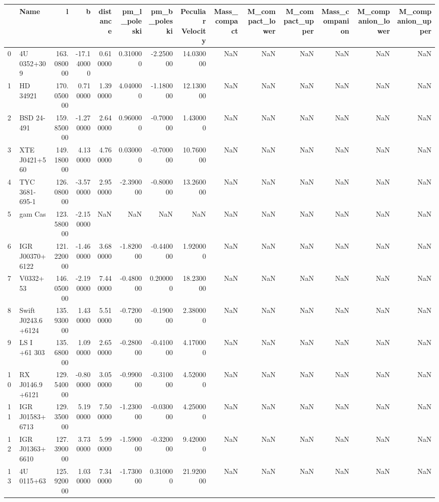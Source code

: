 \begin{tabular}{llrrrrrrrrrrrr}
\toprule
 & Name & l & b & distance & pm_l_poleski & pm_b_poleski & Peculiar Velocity & Mass_compact & M_compact_lower & M_compact_upper & Mass_companion & M_companion_lower & M_companion_upper \\
\midrule
0 & 4U 0352+309 & 163.080000 & -17.140000 & 0.610000 & 0.310000 & -2.250000 & 14.030000 & NaN & NaN & NaN & NaN & NaN & NaN \\
1 & HD 34921 & 170.050000 & 0.710000 & 1.390000 & 4.040000 & -1.180000 & 12.130000 & NaN & NaN & NaN & NaN & NaN & NaN \\
2 & BSD 24-491 & 159.850000 & -1.270000 & 2.640000 & 0.960000 & -0.700000 & 1.430000 & NaN & NaN & NaN & NaN & NaN & NaN \\
3 & XTE J0421+560 & 149.180000 & 4.130000 & 4.760000 & 0.030000 & -0.700000 & 10.760000 & NaN & NaN & NaN & NaN & NaN & NaN \\
4 & TYC 3681-695-1 & 126.080000 & -3.570000 & 2.950000 & -2.390000 & -0.800000 & 13.260000 & NaN & NaN & NaN & NaN & NaN & NaN \\
5 & gam Cas & 123.580000 & -2.150000 & NaN & NaN & NaN & NaN & NaN & NaN & NaN & NaN & NaN & NaN \\
6 & IGR J00370+6122 & 121.220000 & -1.460000 & 3.680000 & -1.820000 & -0.440000 & 1.920000 & NaN & NaN & NaN & NaN & NaN & NaN \\
7 & V0332+53 & 146.050000 & -2.190000 & 7.440000 & -0.480000 & 0.200000 & 18.230000 & NaN & NaN & NaN & NaN & NaN & NaN \\
8 & Swift J0243.6+6124 & 135.930000 & 1.430000 & 5.510000 & -0.720000 & -0.190000 & 2.380000 & NaN & NaN & NaN & NaN & NaN & NaN \\
9 & LS I +61 303 & 135.680000 & 1.090000 & 2.650000 & -0.280000 & -0.410000 & 4.170000 & NaN & NaN & NaN & NaN & NaN & NaN \\
10 & RX J0146.9+6121 & 129.540000 & -0.800000 & 3.050000 & -0.990000 & -0.310000 & 4.520000 & NaN & NaN & NaN & NaN & NaN & NaN \\
11 & IGR J01583+6713 & 129.350000 & 5.190000 & 7.500000 & -1.230000 & -0.030000 & 4.250000 & NaN & NaN & NaN & NaN & NaN & NaN \\
12 & IGR J01363+6610 & 127.390000 & 3.730000 & 5.990000 & -1.590000 & -0.320000 & 9.420000 & NaN & NaN & NaN & NaN & NaN & NaN \\
13 & 4U 0115+63 & 125.920000 & 1.030000 & 7.340000 & -1.730000 & 0.310000 & 21.920000 & NaN & NaN & NaN & NaN & NaN & NaN \\

\end{tabular}
